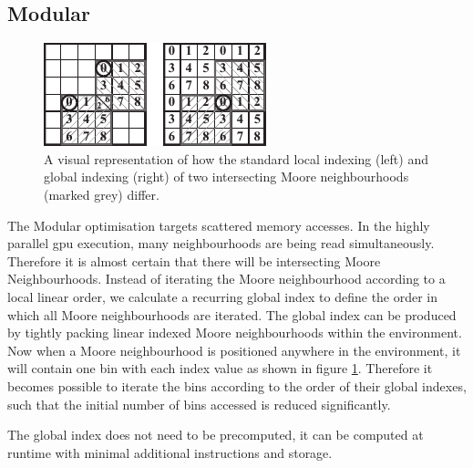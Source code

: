     

  \subsection{Modular}
\begin{figure}[!t]
\centering
\includegraphics[width=\linewidth]{../resources/modular/modular.pdf}
\caption{\label{fig:modular}A visual representation of how the standard local indexing (left) and global indexing (right) of two intersecting Moore neighbourhoods (marked grey) differ.}
\end{figure}
    The Modular optimisation targets scattered memory accesses. In the highly parallel \gls{gpu} execution, many neighbourhoods are being read simultaneously. Therefore it is almost certain that there will be intersecting Moore Neighbourhoods. Instead of iterating the Moore neighbourhood according to a local linear order, we calculate a recurring global index to define the order in which all Moore neighbourhoods are iterated. The global index can be produced by tightly packing linear indexed Moore neighbourhoods within the environment. Now when a Moore neighbourhood is positioned anywhere in the environment, it will contain one bin with each index value as shown in figure \ref{fig:modular}. Therefore it becomes possible to iterate the bins according to the order of their global indexes, such that the initial number of bins accessed is reduced significantly.
    
    The global index does not need to be precomputed, it can be computed at runtime with minimal additional instructions and storage.
    
